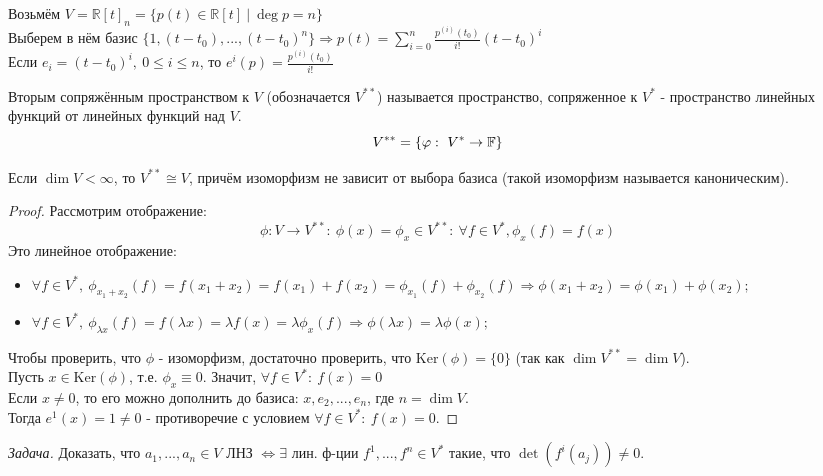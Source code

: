     \begin{example1}
        Возьмём $V = \mathbb{R}[t]_n = \{p(t) \in \mathbb{R}[t] \ | \ \deg p = n\}$\\
        Выберем в нём базис $\{1, (t-t_0), ... , (t-t_0)^n\} \Longrightarrow  p(t) = \sum \limits_{i=0}^n \frac{p^{(i)}(t_0)}{i!}(t-t_0)^i$\\
        Если $e_i = (t-t_0)^i, \ 0\leqslant i\leqslant n$, то $e^i(p) = \frac{p^{(i)}(t_0)}{i!}$
    \end{example1}
    \begin{definition}
        Вторым сопряжённым пространством к $V$ (обозначается $V^{**}$) называется пространство, сопряженное к $V^{*}$ - пространство линейных функций от линейных функций над $V$.
        $$V^{**} = \{\varphi: \ V^{*} \to \mathbb{F}\}$$ 
    \end{definition}
    \begin{theorem}
        Если $\dim V < \infty$, то $V^{**} \cong V$, причём изоморфизм не зависит от выбора базиса (такой изоморфизм называется каноническим). 
    \end{theorem}
    \begin{proof}
        Рассмотрим отображение: 
        $$\phi: V \rightarrow V^{**}: \ \phi(x) = \phi_x \in V^{**} : \ \forall f\in V^{*}, \phi_x(f) = f(x)$$
        Это линейное отображение:
        \begin{itemize}
            \item $\forall f\in V^{*}, \ \phi_{x_1+x_2}(f) = f(x_1 + x_2) = f(x_1) + f(x_2) = \phi_{x_1}(f) + \phi_{x_2}(f) \Longrightarrow  \phi(x_1 + x_2) = \phi(x_1) + \phi(x_2);$ 
            \item $\forall f\in V^{*}, \ \phi_{\lambda x}(f) = f(\lambda x) = \lambda f(x) = \lambda\phi_{x}(f) \Longrightarrow \phi(\lambda x) = \lambda\phi(x);$ 
        \end{itemize}
        Чтобы проверить, что $\phi$ - изоморфизм, достаточно проверить, что $\text{Ker} (\phi) = \{0\}$ (так как $\dim V^{**} = \dim V$).\\
        Пусть $x \in \text{Ker} (\phi)$, т.е. $\phi_x \equiv 0$. Значит,  $\forall f \in V^{*} : \ f(x) = 0$\\
        Если $x \neq 0$, то его можно дополнить до базиса: $x, e_2, ... , e_n$, где $n = \dim V$.\\
        Тогда $e^1(x) = 1 \neq 0$ - противоречие с условием $\forall f \in V^{*} : \ f(x) = 0$.
    \end{proof}
    \textit{Задача.} Доказать, что $a_1,...,a_n\in V$ ЛНЗ $\Leftrightarrow \exists$ лин. ф-ции $f^1,...,f^n\in V^{*}$ такие, что $\det(f^i(a_j)) \neq 0$.
